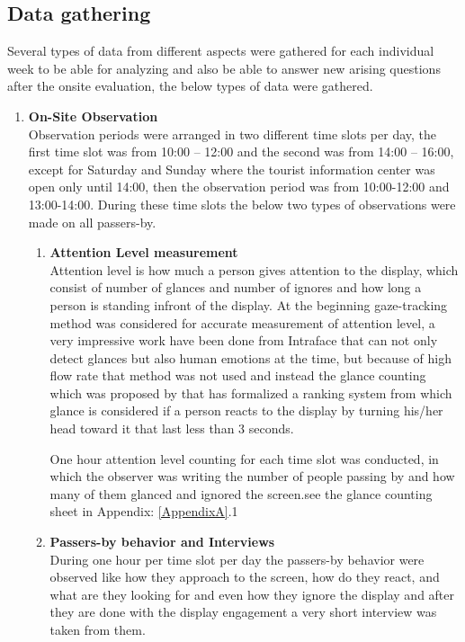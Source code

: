 \subsection{Data gathering}
Several types of data from different aspects were gathered for each individual week to be able for analyzing and also be able to answer new arising questions after the onsite evaluation, the below types of data were gathered.


\begin{enumerate}
\item \textbf{On-Site Observation} \\
Observation periods were arranged in two different time slots per day, the first time slot was from 10:00 – 12:00 and the second was from 14:00 – 16:00, except for Saturday and Sunday where the tourist information center was open only until 14:00, then the observation period was from 10:00-12:00 and 13:00-14:00. During these time slots the below two types of observations were made on all passers-by.


\begin{enumerate}
\item \textbf{Attention Level measurement} \\
Attention level is how much a person gives attention to the display, which consist of number of glances and number of ignores and how long a person is standing infront of the display. At the beginning gaze-tracking method was considered for accurate measurement of attention level, a very impressive work have been done from Intraface \cite{Intraface} that can not only detect glances but also human emotions at the time, but because of high flow rate that method was not used and instead the glance counting which was proposed by \cite{glancingcount} that has formalized a ranking system from which  glance is considered if a person reacts to the display by turning his/her head toward it that last less than 3 seconds.

One hour attention level counting for each time slot was conducted, in which the observer was writing the number of people passing by and how many of them glanced and ignored the screen.see the glance counting sheet in Appendix: \ref{AppendixA}.1


\item \textbf{Passers-by behavior and Interviews} \\
During one hour per time slot per day the passers-by behavior were observed like how they approach to the screen, how do they react, and what are they looking for and even how they ignore the display and after they are done with the display engagement a very short interview was taken from them. 


\end{enumerate}
\end{enumerate}
